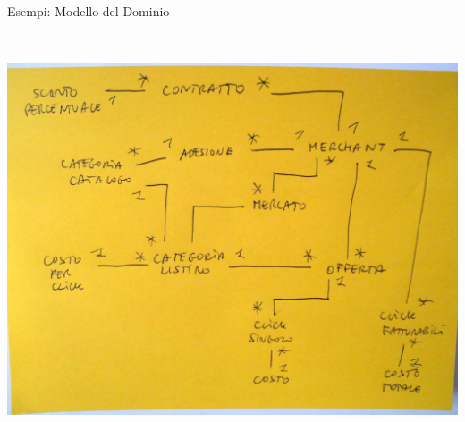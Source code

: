 \begin{frame}{Esempi: Modello del Dominio}
\begin{columns}[T]
\begin{column}{.5\textwidth}
				\\ \vspace*{0.3cm}
				\hspace*{-0.3cm} \includegraphics[scale=0.13]{images/domain-3}
		    \end{column}
		 \end{columns}
	\end{frame}

